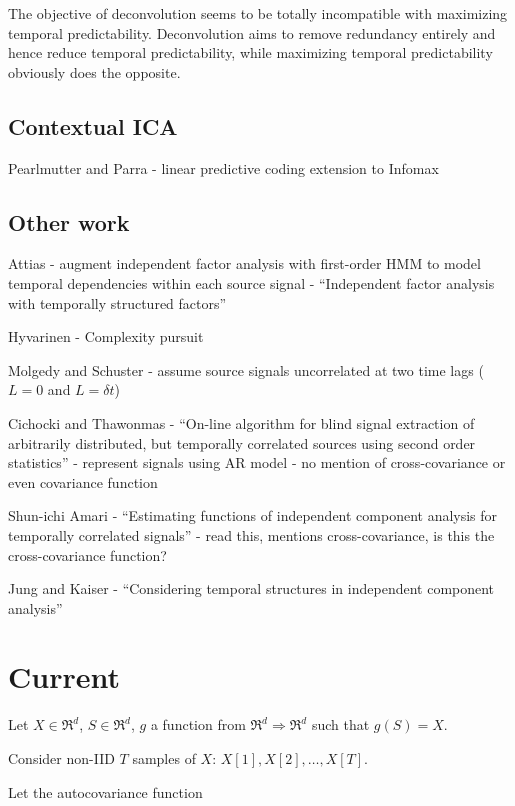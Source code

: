 \documentclass{article}
\begin{document}
  The objective of deconvolution seems to be totally incompatible with maximizing temporal predictability. Deconvolution aims to remove redundancy entirely and hence reduce temporal predictability, while maximizing temporal predictability obviously does the opposite.
  
  \subsection{Contextual ICA}
  Pearlmutter and Parra - linear predictive coding extension to Infomax
  
  \subsection{Other work}

  Attias - augment independent factor analysis with first-order HMM to model temporal dependencies within each source signal - ``Independent factor analysis with temporally structured factors''
  
  Hyvarinen - Complexity pursuit
  
  Molgedy and Schuster - assume source signals uncorrelated at two time lags ($L=0$ and $L=\delta t$)
  
  Cichocki and Thawonmas - ``On-line algorithm for blind signal extraction of arbitrarily distributed, but temporally correlated sources using second order statistics'' - represent signals using AR model - no mention of cross-covariance or even covariance function
  
  Shun-ichi Amari - ``Estimating functions of independent component analysis for temporally correlated signals'' - read this, mentions cross-covariance, is this the cross-covariance function?
  
  Jung and Kaiser - ``Considering temporal structures in independent component analysis''
  
  \section{Current}
  
  Let $X \in \mathfrak{R}^d$, $S \in \mathfrak{R}^d$, $g$ a function from $\mathfrak{R}^d \Rightarrow \mathfrak{R}^d$ such that $g(S) = X$.
  
  Consider non-IID $T$ samples of $X$: $X[1], X[2], \ldots, X[T]$.
  
  Let the autocovariance function
\end{document}
